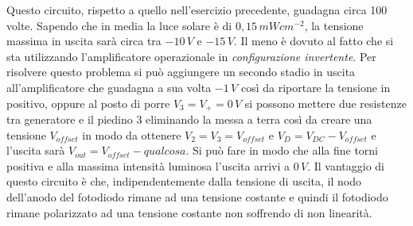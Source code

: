 \documentclass[12pt, a4paper]{report}
\begin{document}
\begin{appendices}
\begin{enumerate}
    Questo circuito, rispetto a quello nell'esercizio precedente, guadagna circa 100 volte. Sapendo che in media la luce solare è di $0,15\,mWcm^{-2}$, la tensione massima in uscita sarà circa tra $-10\,V$ e $-15\,V$. Il meno è dovuto al fatto che si sta utilizzando l'amplificatore operazionale in \textit{configurazione invertente}. Per risolvere questo problema si può aggiungere un secondo stadio in uscita all'amplificatore che guadagna a sua volta $-1\,V$ così da riportare la tensione in positivo, oppure al posto di porre $V_{3} = V_{+} = 0\,V$ si possono mettere due resistenze tra generatore e il piedino 3 eliminando la messa a terra così da creare una tensione $V_{offset}$ in modo da ottenere $V_{2} = V_{3} = V_{offset}$ e  $V_{D} = V_{DC} - V_{offset}$ e l'uscita sarà $V_{out} = V_{offset} - qualcosa$. Si può fare in modo che alla fine torni positiva e alla massima intensità luminosa l'uscita arrivi a $0\,V$. Il vantaggio di questo circuito è che, indipendentemente dalla tensione di uscita, il nodo dell'anodo del fotodiodo rimane ad una tensione costante e quindi il fotodiodo rimane polarizzato ad una tensione costante non soffrendo di non linearità.
\end{enumerate}

\end{appendices}
\end{document}
